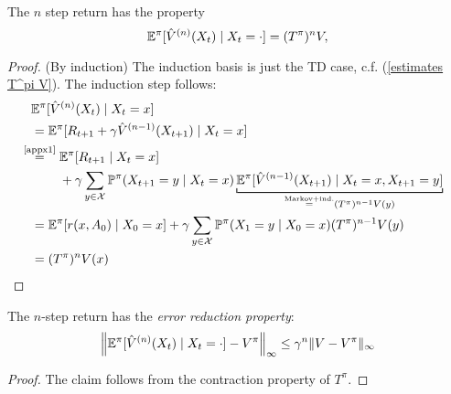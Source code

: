\begin{lemma} The \(n\) step return has the property
	\[
		\mathbb{E}^\pi[ \hat{V}^{(n)}(X_t)\mid X_t=\cdot]=(T^\pi)^n V,
	\]
\end{lemma}
\begin{proof}
	(By induction) The induction basis is just the TD case, c.f. (\ref{estimates T^pi V}). The induction step follows:
	\begin{align*}
		&\E^\pi[ \hat{V}^{(n)}(X_t)\mid X_t=x]\\
		&=\E^\pi[R_{t+1}+\gamma\hat{V}^{(n-1)}(X_{t+1})\mid X_t=x]\\
		&\lxeq{\text{\ref{appx1}}}
		\begin{aligned}[t]
			&\E^\pi[R_{t+1}\mid X_t=x] \\
			&+ \gamma\sum_{y\in\cX} \Pr^\pi(X_{t+1}=y\mid X_t=x) 
			\underbracket[0.7pt]{\E^\pi[\hat{V}^{(n-1)}(X_{t+1})\mid X_t=x,X_{t+1}=y]}_{
				\xeq{\text{Markov+ind.}} (T^\pi)^{n-1} V(y)
			}
		\end{aligned}\\
		&=\E^\pi[r(x,A_0)\mid X_0=x] 
		+\gamma\sum_{y\in\cX} \Pr^\pi(X_{1}=y\mid X_0=x)(T^\pi)^{n-1} V(y)\\
		&=(T^\pi)^n V(x) \qedhere
	\end{align*}
\end{proof}
\begin{corollary}\label{error reduction} The \(n\)-step return has the \emph{error reduction property}:
	\[
		\left\| \mathbb{E}^\pi[ \hat{V}^{(n)}(X_t)\mid X_t=\cdot] - V^\pi\right\|_\infty \le \gamma^n \| V-V^\pi\|_\infty
	\]
\end{corollary}
\begin{proof}
	The claim follows from the contraction property of \(T^\pi\).
\end{proof}
